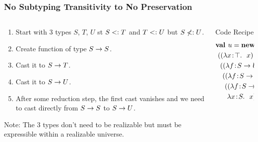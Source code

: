 \documentclass{beamer}
\begin{document}
\begin{frame}
\frametitle{No Subtyping Transitivity to No Preservation}
\begin{columns}
\begin{column}[t]{6cm}
\begin{enumerate}
\item Start with 3 types $S$, $T$, $U$ st $S <: T$ and $T <: U$ but $S \not<: U$.
\item Create function of type $S \rightarrow S$.
\item Cast it to $S \rightarrow T$.
\item Cast it to $S \rightarrow U$.
\item After some reduction step, the first cast vanishes and we need to cast directly from $S \rightarrow S$ to $S \rightarrow U$.
\end{enumerate}
Note: The 3 types don't need to be realizable but must be expressible within a realizable universe.
\end{column}
\begin{column}[t]{4cm}
\begin{block}{Code Recipe}
\begin{align*}
&\mlnew u \ldots {
\ \mlapp{\abs x \Top x}{
\ \ \mlapp{\abs f {S \tfun U} f}{
\ \ \ \mlapp{\abs f {S \tfun T} f}{
\ \ \ \ \mlapp{\abs f {S \tfun S} f}{
\ \ \  \ \ \abs x S x}}}}}
\end{align*}
\end{block}
\end{column}
\end{columns}
\end{frame}
\end{document}
